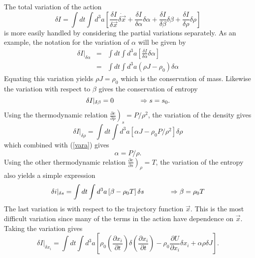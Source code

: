 The total variation of the action
\begin{equation}
\delta I = \int dt \int d^3a \left[ \frac{\delta I}{\delta \vec x}\dot{\delta \vec x} + \frac{\delta I}{\delta \alpha}{\delta \alpha} + \frac{\delta I}{\delta \beta}{\delta \beta} + \frac{\delta I}{\delta \rho}{\delta \rho} \right]
\end{equation}
is more easily handled by considering the partial variations separately.  As an example, the notation for the variation of $\alpha$ will be given by
\begin{eqnarray}\label{vara}
\delta I \vert_{\delta \alpha} & = & \int dt \int d^3a \left[ \frac{\delta I}{\delta \alpha} {\delta \alpha} \right] \nonumber \\
& = & \int dt \int d^3a (\rho J  - \rho_0) \delta \alpha
\end{eqnarray}
Equating this variation yields $\rho J = \rho_0$ which is the conservation of mass.
Likewise the variation with respect to $\beta$ gives the conservation of entropy
\begin{equation}
\delta I \vert_{\delta \beta} = 0 \hspace{0.5 in} \Rightarrow s = s_0.
\end{equation} 
Using the thermodynamic relation $\left. \frac{\partial e}{\partial \rho} \right) _{s} = P/{\rho}^2$, the variation of the density gives
\begin{equation}
\delta I \vert_{\delta \rho} = \int dt \int d^3a \left[ \alpha J - \rho_0 P/{\rho}^2 \right] \delta \rho
\end{equation}
which combined with (\ref{vara}) gives
\begin{equation}
\alpha = P/{\rho}.
\end{equation}
Using the other thermodynamic relation $\left. \frac{\partial e}{\partial s} \right)_{\rho} = T$, the variation of the entropy also yields a simple expression
\begin{equation}
\delta i \vert_{\delta s} = \int dt \int d^3a \left[ \beta - \rho_0 T \right] \delta s \hspace{0.5 in} \Rightarrow \beta = \rho_0 T
\end{equation}
The last variation is with respect to the trajectory function ${\vec x}$.  This is the most difficult variation since many of the terms in the action have dependence on ${\vec x}$.  Taking the variation gives
\begin{equation}
\delta I \vert_{\delta x_i} = \int dt \int d^3a \left[ \rho_0 \left(\frac{\partial x_i}{\partial t}\right)\delta \left(\frac{\partial x_i}{\partial t} \right) - \rho_0 \frac{\partial U}{\partial x_i} \delta {x_i} + \alpha \rho \delta J \right].
\end{equation}
